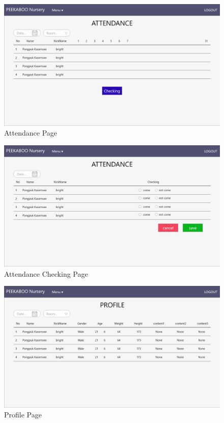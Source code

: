 \begin{figure}
  \begin{center}
  \includegraphics[width=\linewidth]{images/AttendancePage.png}
  \end{center}
  \caption[Poem]{Attendance Page}
  \label{fig:Attendance}
  \end{figure}

\begin{figure}
  \begin{center}
  \includegraphics[width=\linewidth]{images/AttendancePageChecking.png}
  \end{center}
  \caption[Poem]{Attendance Checking Page}
  \label{fig:CheckAttendance}
  \end{figure}

\begin{figure}
  \begin{center}
  \includegraphics[width=\linewidth]{images/ProfileOnePage.png}
  \end{center}
  \caption[Poem]{Profile Page}
  \label{fig:Profile}
  \end{figure}

